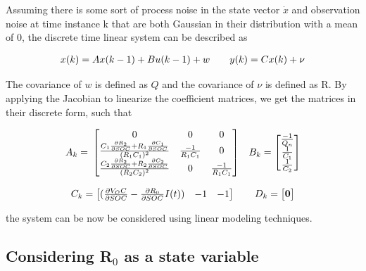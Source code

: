 \documentclass[12pt]{article}
\begin{document}
\par
Assuming there is some sort of process noise in the state vector $\dot{x}$ and observation noise at time instance k that are both Gaussian in their distribution with a mean of 0, the discrete time linear system can be described as 

\begin{equation}
\centering
\begin{matrix}
x(k) = Ax(k-1) + Bu(k-1) + w &&
y(k) = Cx(k) + \nu
\end{matrix}
\end{equation} 

The covariance of $w$ is defined as $Q$ and the covariance of $\nu$ is defined as R.  By applying the Jacobian to linearize the coefficient matrices, we get the matrices in their discrete form, such that

\begin{equation}
\centering
\begin{matrix}
A_k = \:
\begin{bmatrix}
0 & 0 & 0 \\
\frac{C_1\frac{\partial{R_2}}{\partial{SOC}} + R_1\frac{\partial{C_1}}{\partial{SOC}}}{(R_1C_1)^2} & \frac{-1}{R_1C_1} & 0 \\
\frac{C_2\frac{\partial{R_2}}{\partial{SOC}} + R_2\frac{\partial{C_2}}{\partial{SOC}}}{(R_2C_2)^2} & 0 & \frac{-1}{R_1C_1}\\
\end{bmatrix}
& B_k = 
\begin{bmatrix}
\frac{-1}{Q_n} \\
\frac{1}{C_1} \\
\frac{1}{C_2} 
\end{bmatrix} \\ \\
C_k = 
\begin{bmatrix}
(\frac{\partial{V_OC}}{\partial{SOC}} - \frac{\partial{R_0}}{\partial{SOC}}I(t)) & -1 & -1
\end{bmatrix} &

D_k = 
\begin{bmatrix}
\bf{0}
\end{bmatrix}
\end{matrix}
\end{equation}

the system can be now be considered using linear modeling techniques. 

\subsection{Considering R$_0$ as a state variable}
\end{document}
